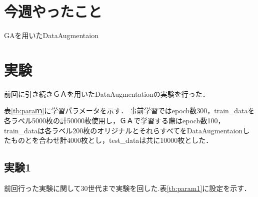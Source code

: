 \documentclass[twocolumn]{ujarticle}     %
\begin{document}
	

\section{今週やったこと}
 GAを用いたDataAugmentaion

\section{実験}
前回に引き続きＧＡを用いたDataAugmentationの実験を行った．
\begin{table}[h]
	\centering
	\caption{学習パラメータ\label{tb:paraｍ}}
\end{table}
表\ref{tb:paraｍ}に学習パラメータを示す．
事前学習ではepoch数300，train\_dataを各ラベル5000枚の計50000枚使用し，ＧＡで学習する際はepoch数100，train\_dataは各ラベル200枚のオリジナルとそれらすべてをDataAugmentaionしたものとを合わせ計4000枚とし，test\_dataは共に10000枚とした．
\subsection{実験1}
 前回行った実験に関して30世代まで実験を回した.表\ref{tb:param1}に設定を示す．
\begin{table}[h]
	\centering
	\caption{実験1\label{tb:param1}}
\end{table}
\end{document}
